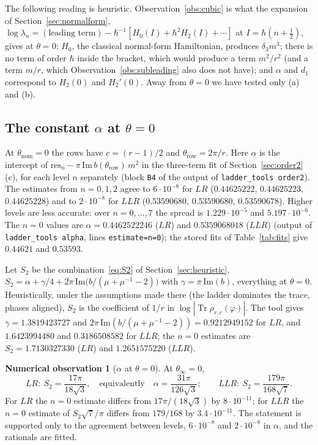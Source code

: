 \documentclass[11pt]{amsart}
\theoremstyle{definition}
\newtheorem{observation}[conjecture]{Numerical observation}
\theoremstyle{remark}
\newcommand{\Tr}{\operatorname{Tr}}
\begin{document}
The following reading is heuristic. Observation~\ref{obs:cubic} is what the expansion
of Section~\ref{sec:normalform},
$\log\lambda_n = (\text{leading term}) - \hbar^{-1}[H_0(I) + \hbar^2H_2(I) + \cdots]$ at
$I = \hbar(n+\frac12)$, gives at $\theta = 0$: $H_0$, the classical normal-form
Hamiltonian, produces $\delta_3m^3$; there is no term of order $\hbar$ inside the
bracket, which would produce a term $m^2/r^2$ (and a term $m/r$, which
Observation~\ref{obs:subleading} also does not have); and $\alpha$ and $d_1$
correspond to $H_2(0)$ and $H_2'(0)$. Away from $\theta = 0$ we have tested only (a)
and (b).

\subsection{The constant $\alpha$ at $\theta = 0$}\label{sec:alpha0}
At $\theta_{\mathrm{nom}} = 0$ the rows have $c = (r-1)/2$ and
$\theta_{\mathrm{row}} = 2\pi/r$. Here $\alpha$ is the intercept of
$\mathrm{res}_n - \pi\,\mathrm{Im}\,b(\theta_{\mathrm{row}})\,m^2$ in the three-term fit
of Section~\ref{sec:order2}(c), for each level $n$ separately (block \texttt{B4} of the
output of \texttt{ladder\_tools order2}). The estimates from $n = 0, 1, 2$ agree to
$6\cdot10^{-8}$ for $LR$ ($0.44625222$, $0.44625223$, $0.44625228$) and to
$2\cdot10^{-8}$ for $LLR$ ($0.53590680$, $0.53590680$, $0.53590678$). Higher levels are
less accurate: over $n = 0, \dots, 7$ the spread is $1.229\cdot10^{-5}$ and
$5.197\cdot10^{-6}$. The $n = 0$ values are $\alpha = 0.4462522246$ ($LR$) and
$0.5359068018$ ($LLR$) (output of \texttt{ladder\_tools alpha}, lines
\texttt{estimate=n=0}); the stored fits of Table~\ref{tab:fits} give $0.44621$ and
$0.53593$.

Let $S_2$ be the combination~\eqref{eq:S2} of Section~\ref{sec:heuristic},
$S_2 = \alpha + \gamma/4 + 2\pi\,\mathrm{Im}\big(b/(\mu + \mu^{-1} - 2)\big)$ with
$\gamma = \pi\,\mathrm{Im}(b)$, everything at $\theta = 0$. Heuristically, under the
assumptions made there (the ladder dominates the trace, phases aligned), $S_2$ is the
coefficient of $1/r$ in $\log|\Tr\rho_{r,c}(\varphi)|$. The tool gives
$\gamma = 1.3819423727$ and $2\pi\,\mathrm{Im}(b/(\mu+\mu^{-1}-2)) = 0.9212949152$ for
$LR$, and $1.6423994480$ and $0.3186508582$ for $LLR$; the $n = 0$ estimates are
$S_2 = 1.7130327330$ ($LR$) and $1.2651575220$ ($LLR$).

\begin{observation}[$\alpha$ at $\theta = 0$]\label{obs:alpha0}
At $\theta_\infty = 0$,
\[
LR:\ S_2 = \frac{17\pi}{18\sqrt3}, \quad\text{equivalently}\quad
\alpha = \frac{31\pi}{126\sqrt3}; \qquad
LLR:\ S_2 = \frac{179\pi}{168\sqrt7}.
\]
For $LR$ the $n = 0$ estimate differs from $17\pi/(18\sqrt3)$ by $8\cdot10^{-11}$; for
$LLR$ the $n = 0$ estimate of $S_2\sqrt7/\pi$ differs from $179/168$ by
$3.4\cdot10^{-11}$. The statement is supported only to the agreement between levels,
$6\cdot10^{-8}$ and $2\cdot10^{-8}$ in $\alpha$, and the rationals are fitted.
\end{observation}
\end{document}
